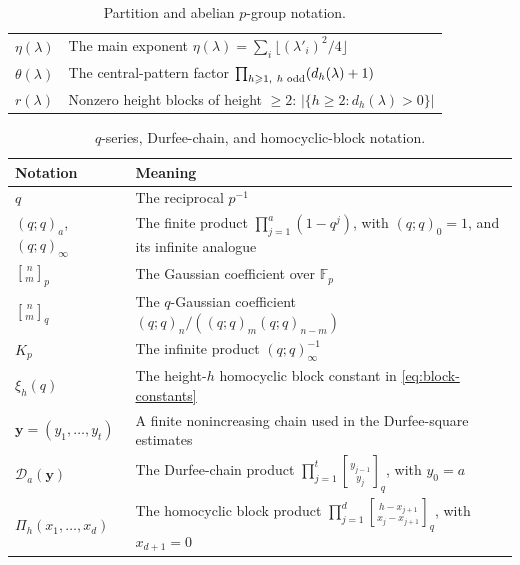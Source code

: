 \documentclass[a4paper,11pt,reqno]{amsart}
\theoremstyle{plain}
\theoremstyle{remark}
\numberwithin{equation}{section}
\newcommand{\card}[1]{\left\lvert #1\right\rvert}
\newcommand{\gauss}[2]{\genfrac{[}{]}{0pt}{}{#1}{#2}_p}
\newcommand{\qgauss}[2]{\genfrac{[}{]}{0pt}{}{#1}{#2}_q}
\renewcommand{\geq}{\geqslant}
\begin{document}
\begin{table}[htbp]
\begin{tabular}{@{}p{}p{}@{}}
$\eta(\lambda)$
& The main exponent
  $\eta(\lambda)=\sum_i\lfloor(\lambda'_i)^2/4\rfloor$ \\

$\theta(\lambda)$
& The central-pattern factor
  $\prod_{h\geq 1,\ h\textnormal{ odd}}(d_h(\lambda)+1)$ \\

$r(\lambda)$
& Nonzero height blocks of height $\geq 2$:
  $\card{\{h\geq 2:d_h(\lambda)>0\}}$ \\
\bottomrule
\end{tabular}
\endgroup
\vspace{0.2em}
\caption{Partition and abelian $p$-group notation.}
\label{tab:notation}
\end{table}

\FloatBarrier
\begin{table}[htbp]
\centering
\footnotesize
\begingroup
\renewcommand{\arraystretch}{1.12}
\begin{tabular}{@{}p{}p{}@{}}
\toprule
Notation & Meaning \\
\midrule
$q$
& The reciprocal $p^{-1}$ \\

$(q;q)_a$, $(q;q)_\infty$
& The finite product $\prod_{j=1}^a(1-q^j)$, with $(q;q)_0=1$, and its
  infinite analogue \\

$\gauss{n}{m}$
& The Gaussian coefficient over $\mathbb F_p$ \\

$\qgauss{n}{m}$
& The $q$-Gaussian coefficient
  $(q;q)_n/((q;q)_m(q;q)_{n-m})$ \\

$K_p$
& The infinite product $(q;q)_\infty^{-1}$ \\

$\xi_h(q)$
& The height-$h$ homocyclic block constant in \eqref{eq:block-constants} \\

$\mathbf y=(y_1,\ldots,y_t)$
& A finite nonincreasing chain used in the Durfee-square estimates \\

$\mathcal D_a(\mathbf y)$
& The Durfee-chain product
  $\prod_{j=1}^t\qgauss{y_{j-1}}{y_j}$, with $y_0=a$ \\

$\Pi_h(x_1,\ldots,x_d)$
& The homocyclic block product
  $\prod_{j=1}^{d}\qgauss{h-x_{j+1}}{x_j-x_{j+1}}$, with $x_{d+1}=0$ \\
\bottomrule
\end{tabular}
\endgroup
\vspace{0.2em}
\caption{$q$-series, Durfee-chain, and homocyclic-block notation.}
\label{tab:q-notation}
\end{table}
\end{document}
